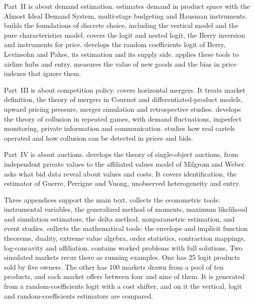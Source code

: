 Part~II is about demand estimation.  estimates demand in product space with the Almost Ideal
Demand System, multi-stage budgeting and Hausman instruments.  builds the foundations of
discrete choice, including the vertical model and the pure characteristics model.  covers the
logit and nested logit, the Berry inversion and instruments for price.  develops the random
coefficients logit of Berry, Levinsohn and Pakes, its estimation and its supply side. 
applies these tools to airline hubs and entry.  measures the value of new goods and the bias
in price indexes that ignore them.

Part~III is about competition policy.  covers horizontal mergers. It treats market
definition, the theory of mergers in Cournot and differentiated-product models, upward pricing pressure,
merger simulation and retrospective studies.  develops the theory of collusion in
repeated games, with demand fluctuations, imperfect monitoring, private information and communication.
 studies how real cartels operated and how collusion can be detected in prices and
bids.

Part~IV is about auctions.  develops the theory of single-object auctions, from
independent private values to the affiliated values model of Milgrom and Weber. 
asks what bid data reveal about values and costs. It covers identification, the estimator of Guerre, Perrigne
and Vuong, unobserved heterogeneity and entry.

Three appendices support the main text.  collects the econometric tools: instrumental variables, the
generalized method of moments, maximum likelihood and simulation estimators, the delta method, nonparametric
estimation, and event studies.  collects the mathematical tools: the envelope and implicit
function theorems, duality, extreme value algebra, order statistics, contraction mappings, log-concavity and
affiliation.  contains worked problems with full solutions. Two simulated markets recur
there as running examples. One has 25 logit products sold by five owners. The other has 100 markets drawn from a pool of ten
products, and each market offers between four and nine of them. It is generated from a random-coefficients logit
with a cost shifter, and on it the vertical, logit and random-coefficients estimators are compared.

